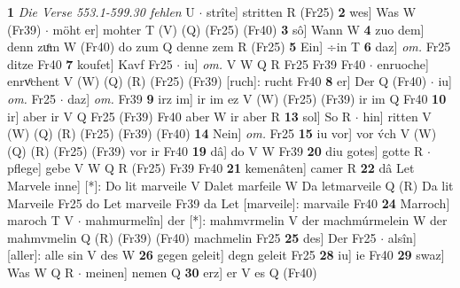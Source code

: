 \documentclass[8pt,a4paper,notitlepage]{article}
\begin{document}
\begin{table}[ht]
\begin{minipage}[t]{0.5\linewidth}
\textbf{1} \textit{Die Verse 553.1-599.30 fehlen} U   $\cdot$ strîte] stritten R (Fr25) \textbf{2} wes] Was W (Fr39)  $\cdot$ möht er] mohter T (V) (Q) (Fr25) (Fr40) \textbf{3} sô] Wann W \textbf{4} zuo dem] denn zuͦm W (Fr40) do zum Q denne zem R (Fr25) \textbf{5} Ein] ÷in T \textbf{6} daz] \textit{om.} Fr25 ditze Fr40 \textbf{7} koufet] Kavf Fr25  $\cdot$ iu] \textit{om.} V W Q R Fr25 Fr39 Fr40  $\cdot$ enruoche] enrvͦchent V (W) (Q) (R) (Fr25) (Fr39) [ruch]: rucht  Fr40 \textbf{8} er] Der Q (Fr40)  $\cdot$ iu] \textit{om.} Fr25  $\cdot$ daz] \textit{om.} Fr39 \textbf{9} irz im] ir im ez V (W) (Fr25) (Fr39) ir im Q Fr40 \textbf{10} ir] aber ir V Q Fr25 (Fr39) Fr40 aber W ir aber R \textbf{13} sol] So R  $\cdot$ hin] ritten V (W) (Q) (R) (Fr25) (Fr39) (Fr40) \textbf{14} Nein] \textit{om.} Fr25 \textbf{15} iu vor] vor v́ch V (W) (Q) (R) (Fr25) (Fr39) vor ir Fr40 \textbf{19} dâ] do V W Fr39 \textbf{20} diu gotes] gotte R  $\cdot$ pflege] gebe V W Q R (Fr25) Fr39 Fr40 \textbf{21} kemenâten] camer R \textbf{22} dâ Let Marvele inne] [*]: Do lit marveile V Dalet marfeile W Da letmarveile Q (R) Da lit Marveile Fr25 do Let marveile Fr39 da Let [marveile]: marvaile Fr40 \textbf{24} Marroch] maroch T V  $\cdot$ mahmurmelîn] der [*]: mahmvrmelin V der machmúrmelein W der mahmvmelin Q (R) (Fr39) (Fr40) machmelin Fr25 \textbf{25} des] Der Fr25  $\cdot$ alsîn] [aller]: alle sin V des W \textbf{26} gegen geleit] degn geleit Fr25 \textbf{28} iu] ie Fr40 \textbf{29} swaz] Was W Q R  $\cdot$ meinen] nemen Q \textbf{30} erz] er V es Q (Fr40) \newline
\end{minipage}
\end{table}
\end{document}

